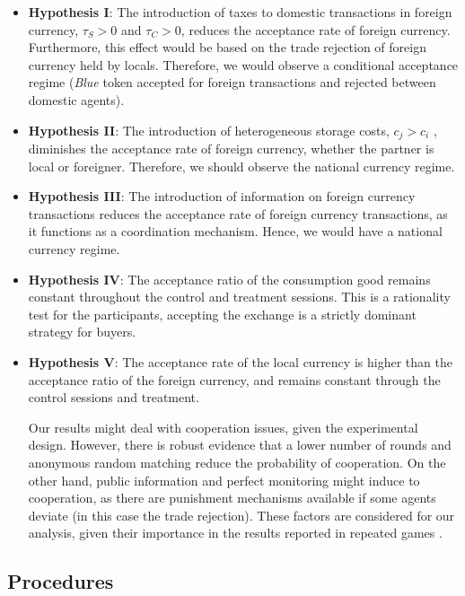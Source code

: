 \begin{itemize}
\item[] \textbf{Hypothesis I}: The introduction of taxes to domestic transactions in foreign currency, $\tau_S > 0$ and $\tau_C>0$, reduces the acceptance rate of foreign currency. Furthermore, this effect would be based on the trade rejection of foreign currency held by locals. Therefore, we would observe a conditional acceptance regime (\textit{Blue} token accepted for foreign transactions and rejected between domestic agents). 

\item[] \textbf{Hypothesis II}: The introduction of heterogeneous storage costs, $c_j > c_i$ , diminishes the acceptance rate of foreign currency, whether the partner is local or foreigner. Therefore, we should observe  the national currency regime. 

\item[] \textbf{Hypothesis III}: The introduction of information on foreign currency transactions reduces the acceptance rate of foreign currency transactions, as it functions as a coordination mechanism. Hence, we would have a national currency regime.

\item[] \textbf{Hypothesis IV}: The acceptance ratio of the consumption good remains constant throughout the control and treatment sessions. This is a rationality test for the participants, accepting the exchange is a strictly dominant strategy for buyers. 

\item[] \textbf{Hypothesis V}: The acceptance rate of the local currency is higher than the acceptance ratio of the foreign currency, and remains constant through the control sessions and treatment. 


Our results might deal with cooperation issues, given the experimental design. However, there is robust evidence that a lower number of rounds and anonymous random matching reduce the probability of cooperation. On the other hand, public information and perfect monitoring might induce to cooperation, as there are punishment mechanisms available if some agents deviate (in this case the trade rejection). These factors are considered for our analysis, given their importance in the results reported in repeated games \citep{10.1257/jel.20160980}.

\end{itemize}

\subsection{Procedures}

